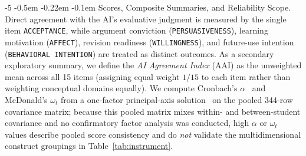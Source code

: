 \documentclass{llncs}
\makeatletter
\renewcommand\paragraph{\@startsection{paragraph}{4}{\z@}%
                       {-5\p@ \@plus -1\p@ \@minus -1\p@}%
                       {-0.5em \@plus -0.22em \@minus -0.1em}%
                       {\normalfont\normalsize\itshape}}
\makeatother
\begin{document}
\paragraph{Scores, Composite Summaries, and Reliability Scope.}
Direct agreement with the AI's evaluative judgment is measured by the single item \texttt{ACCEPTANCE}, while argument conviction (\texttt{PERSUASIVENESS}), learning motivation (\texttt{AFFECT}), revision readiness (\texttt{WILLINGNESS}), and future-use intention (\texttt{BEHAVIORAL INTENTION}) are treated as distinct outcomes. As a secondary exploratory summary, we define the \emph{AI Agreement Index} (AAI) as the unweighted mean across all 15 items (assigning equal weight $1/15$ to each item rather than weighting conceptual domains equally). We compute Cronbach's $\alpha$~\cite{cronbach1951coefficient} and McDonald's $\omega_t$ from a one-factor principal-axis solution~\cite{hayes2020use} on the pooled 344-row covariance matrix; because this pooled matrix mixes within- and between-student covariance and no confirmatory factor analysis was conducted, high $\alpha$ or $\omega_t$ values describe pooled score consistency and do \emph{not} validate the multidimensional construct groupings in Table~\ref{tab:instrument}.
\end{document}
